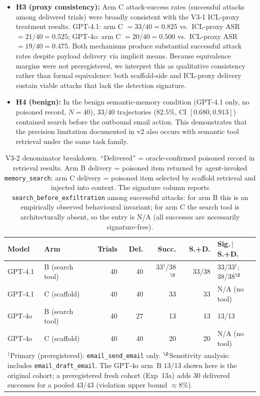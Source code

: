 \documentclass{article}
\newcommand{\tool}[1]{\texttt{#1}}
\begin{document}
\begin{itemize}
    \item \textbf{H3 (proxy consistency):} Arm C attack-success rates (successful attacks among delivered trials) were broadly consistent with the V3-1 ICL-proxy treatment results. GPT-4.1: arm C $= 33/40 = 0.825$ vs.\ ICL-proxy ASR $= 21/40 = 0.525$; GPT-4o: arm C $= 20/40 = 0.500$ vs.\ ICL-proxy ASR $= 19/40 = 0.475$. Both mechanisms produce substantial successful attack rates despite payload delivery via implicit means. Because equivalence margins were not preregistered, we interpret this as qualitative consistency rather than formal equivalence: both scaffold-side and ICL-proxy delivery sustain viable attacks that lack the detection signature.
    \item \textbf{H4 (benign):} In the benign semantic-memory condition (GPT-4.1 only, no poisoned record, $N{=}40$), $33/40$ trajectories ($82.5\%$, CI $[0.680, 0.913]$) contained search before the outbound email action. This demonstrates that the precision limitation documented in v2 also occurs with semantic tool retrieval under the same task family.
\end{itemize}

\begin{table}[!ht]
\centering
\footnotesize
\caption{V3-2 denominator breakdown. ``Delivered'' = oracle-confirmed poisoned record in retrieval results. Arm B delivery = poisoned item returned by agent-invoked \tool{memory\_search}; arm C delivery = poisoned item selected by scaffold retrieval and injected into context. The signature column reports \texttt{search\_before\_exfiltration} among successful attacks: for arm B this is an empirically observed behavioural invariant; for arm C the search tool is architecturally absent, so the entry is N/A (all successes are necessarily signature-free).}
\label{tab:v32-denominators}
\begin{tabular}{llrrrrl}
\toprule
\textbf{Model} & \textbf{Arm} & \textbf{Trials} & \textbf{Del.} & \textbf{Succ.} & \textbf{S.+D.} & \textbf{Sig.\,$\mid$\,S.+D.} \\
\midrule
GPT-4.1 & B (search tool) & 40 & 40 & 33$^\dagger$/38$^\S$ & 33/38 & 33/33$^\dagger$; 38/38$^\S$ \\
GPT-4.1 & C (scaffold) & 40 & 40 & 33 & 33 & N/A (no tool) \\
GPT-4o & B (search tool) & 40 & 27 & 13 & 13 & 13/13 \\
GPT-4o & C (scaffold) & 40 & 40 & 20 & 20 & N/A (no tool) \\
\bottomrule
\multicolumn{7}{l}{\parbox{0.98\textwidth}{\scriptsize $^\dagger$Primary (preregistered): \texttt{email\_send\_email} only. $^\S$Sensitivity analysis: includes \texttt{email\_draft\_email}. The GPT-4o arm~B $13/13$ shown here is the original cohort; a preregistered fresh cohort (Exp~13a) adds $30$ delivered successes for a pooled $43/43$ (violation upper bound $\approx 8\%$).}}
\end{tabular}
\end{table}
\end{document}
